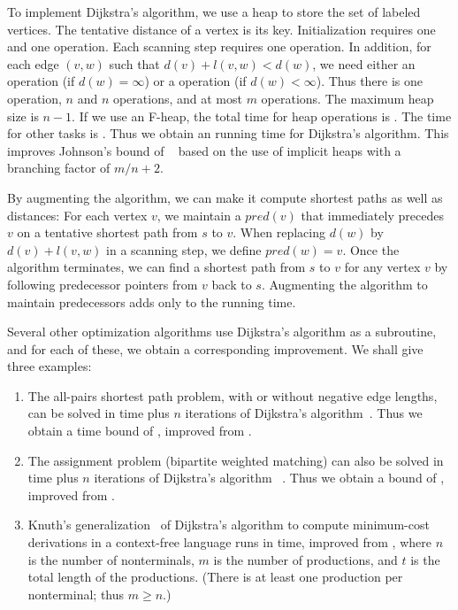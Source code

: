 To implement Dijkstra's algorithm, we use a heap to store the set of labeled
vertices. The tentative distance of a vertex is its key. Initialization requires one
 and one  operation. Each scanning step requires one
 operation. In addition, for each edge \((v, w)\) such that \(d(v)
+ l(v, w) < d(w)\), we need either an  operation (if \(d(w) = \infty\))
or a  operation (if \(d(w) < \infty\)). Thus there is one
 operation, \(n\)  and \(n\)  operations,
and at most \(m\)  operations. The maximum heap size is \(n - 1\).
If we use an F-heap, the total time for heap operations is . The
time for other tasks is . Thus we obtain an  running
time for Dijkstra's algorithm. This improves Johnson's bound of ~\cite{Johnson1977,Tarjan1983} based on the use of implicit heaps with
a branching factor of \(m/n + 2\).

By augmenting the algorithm, we can make it compute shortest paths as well as
distances: For each vertex \(v\), we maintain a 
\(pred(v)\) that immediately precedes \(v\) on a tentative shortest path from \(s\)
to \(v\). When replacing \(d(w)\) by \(d(v) + l(v, w)\) in a scanning step, we define
\(pred(w) = v\). Once the algorithm terminates, we can find a shortest path from
\(s\) to \(v\) for any vertex \(v\) by following predecessor pointers from \(v\) back
to \(s\). Augmenting the algorithm to maintain predecessors adds only  to the
running time.

Several other optimization algorithms use Dijkstra's algorithm as a subroutine, and
for each of these, we obtain a corresponding improvement. We shall give three
examples:
\begin{enumerate}
	\item The all-pairs shortest path problem, with or without negative edge lengths,
		can be solved in  time plus \(n\) iterations of Dijkstra's
		algorithm~\cite{Johnson1977,Tarjan1983}. Thus we obtain a time bound of
		, improved from .
	\item The assignment problem (bipartite weighted matching) can also be solved in
		 time plus \(n\) iterations of Dijkstra's algorithm~%
		\cite{Tarjan1983}.  Thus we obtain a bound of ,
		improved from .
	\item Knuth's generalization~\cite{Knuth1977} of Dijkstra's algorithm to compute
		minimum-cost derivations in a context-free language runs in  time, improved from , where \(n\) is the number of
		nonterminals, \(m\) is the number of productions, and \(t\) is the total
		length of the productions. (There is at least one production per nonterminal;
		thus \(m \geq n\).)
\end{enumerate}

